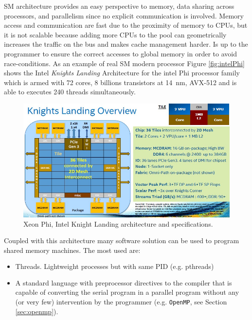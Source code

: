 \begin{description}
\begin{description}
\begin{itemize}
	\end{itemize}
	SM architecture provides an easy perspective to memory,	data sharing across processors, and parallelism since no explicit communication is involved. Memory access and communication are fast due to the proximity of memory to CPUs, but it is not scalable because adding more CPUs to the pool can geometrically increases the traffic on the bus and makes cache management harder. Is up to the programmer to ensure the correct accesses to global memory in order to avoid race-conditions.
	As an example of real SM modern processor Figure \ref{fig:intelPhi} shows the Intel \textit{Knights Landing} Architecture for the intel Phi processor family which is armed with 72 cores, $8$ billions transistors at \SI{14}{\nano\metre}, AVX-512 and is able to executes 240 threads simultaneously.
		\begin{figure}
		\centering
		\label{fig:distribuiteMemory}
		\includegraphics[width=1.0\textwidth]{./images/parallel_programming/xeonphi}
		\caption{Xeon Phi, Intel Knight Landing architecture and specifications.}
	\end{figure}
	Coupled with this architecture many software solution can be used to program
	shared memory machines. The most used are:
	\begin{itemize}
		\item Threads. Lightweight processes but with same PID (e.g. pthreads)
		\item A standard language with preprocessor directives to the compiler that is capable of converting the serial program in a parallel program without any (or very few) intervention by the programmer (e.g. \texttt{OpenMP}, see Section \ref{sec:openmp}).
		
	\end{itemize}
	


\end{description}
\end{description}
